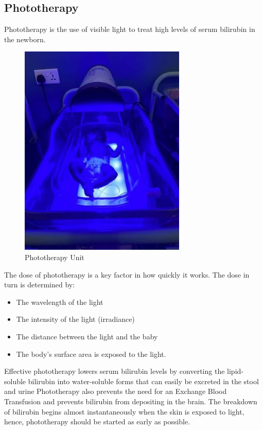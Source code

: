 \documentclass[
  letterpaper,
  DIV=11,
  numbers=noendperiod]{scrreprt}
\providecommand{\tightlist}{%
  \setlength{\itemsep}{0pt}\setlength{\parskip}{0pt}}\usepackage{longtable,booktabs,array}
\begin{document}
\hypertarget{phototherapy}{%
\subsection{Phototherapy}\label{phototherapy}}

Phototherapy is the use of visible light to treat high levels of serum
bilirubin in the newborn.

\begin{figure}

{\centering \includegraphics{neo-phototherapy.jpg}

}

\caption{Phototherapy Unit}

\end{figure}

The dose of phototherapy is a key factor in how quickly it works. The
dose in turn is determined by:

\begin{itemize}
\tightlist
\item
  The wavelength of the light
\item
  The intensity of the light (irradiance)
\item
  The distance between the light and the baby
\item
  The body's surface area is exposed to the light.
\end{itemize}

Effective phototherapy lowers serum bilirubin levels by converting the
lipid-soluble bilirubin into water-soluble forms that can easily be
excreted in the stool and urine Phototherapy also prevents the need for
an Exchange Blood Transfusion and prevents bilirubin from depositing in
the brain. The breakdown of bilirubin begins almost instantaneously when
the skin is exposed to light, hence, phototherapy should be started as
early as possible.
\end{document}

